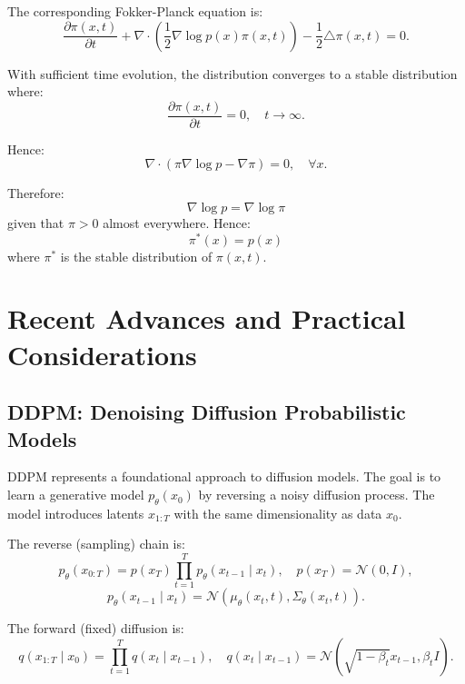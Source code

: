 The corresponding Fokker-Planck equation is:
\begin{equation}
\frac{\partial\pi(x,t)}{\partial t} + \nabla \cdot \left(\frac{1}{2}\nabla\log p(x) \pi(x,t)\right) - \frac{1}{2}\triangle \pi(x,t) = 0.
\end{equation}

With sufficient time evolution, the distribution converges to a stable distribution where:
\begin{equation}
\frac{\partial \pi(x,t)}{\partial t} = 0, \quad t \to \infty.
\end{equation}

Hence:
\begin{equation}
\nabla \cdot (\pi\nabla\log p - \nabla\pi) = 0, \quad \forall x.
\end{equation}

Therefore:
\begin{equation}
\nabla\log p = \nabla\log \pi
\end{equation}
given that $\pi > 0$ almost everywhere. Hence:
\begin{equation}
\pi^*(x) = p(x)
\end{equation}
where $\pi^*$ is the stable distribution of $\pi(x, t)$.

\section{Recent Advances and Practical Considerations}

\subsection{DDPM: Denoising Diffusion Probabilistic Models}

DDPM represents a foundational approach to diffusion models. The goal is to learn a generative model $p_\theta(x_0)$ by reversing a noisy diffusion process. The model introduces latents $x_{1:T}$ with the same dimensionality as data $x_0$.

The reverse (sampling) chain is:
\begin{equation}
p_\theta(x_{0:T}) = p(x_T)\prod_{t=1}^{T} p_\theta(x_{t-1} \mid x_t), \quad p(x_T) = \mathcal{N}(0,I),
\end{equation}
\begin{equation}
p_\theta(x_{t-1} \mid x_t) = \mathcal{N}(\mu_\theta(x_t,t), \Sigma_\theta(x_t,t)).
\end{equation}

The forward (fixed) diffusion is:
\begin{equation}
q(x_{1:T} \mid x_0) = \prod_{t=1}^{T} q(x_t \mid x_{t-1}), \quad q(x_t \mid x_{t-1}) = \mathcal{N}(\sqrt{1-\beta_t} x_{t-1}, \beta_t I).
\end{equation}

